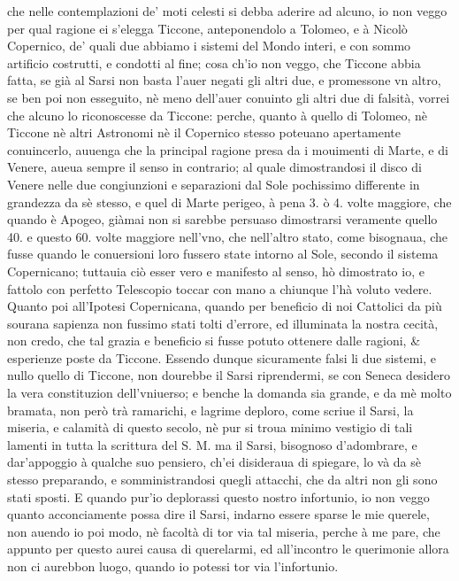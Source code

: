 \documentclass[11pt,twoside,openany]{book}
\begin{document}
che nelle contemplazioni de' moti celesti si debba aderire ad alcuno, io non veggo per qual ragione ei s'elegga Ticcone, anteponendolo a Tolomeo, e à Nicolò Copernico, de' quali due abbiamo i sistemi del Mondo interi, e con sommo artificio costrutti, e condotti al fine; cosa ch'io non veggo, che Ticcone abbia fatta, se già al Sarsi non basta l'auer negati gli altri due, e promessone vn altro, se ben poi non esseguito, nè meno dell'auer conuinto gli altri due di falsità, vorrei che alcuno lo riconoscesse da Ticcone: perche, quanto à quello di Tolomeo, nè Ticcone nè altri Astronomi nè il Copernico stesso poteuano apertamente conuincerlo, auuenga che la principal ragione presa da i mouimenti di Marte, e di Venere, aueua sempre il senso in contrario; al quale dimostrandosi il disco di Venere nelle due congiunzioni e separazioni dal Sole pochissimo differente in grandezza da sè stesso, e quel di Marte perigeo, à pena 3. ò 4. volte maggiore, che quando è Apogeo, giàmai non si sarebbe persuaso dimostrarsi veramente quello 40. e questo 60. volte maggiore nell'vno, che nell'altro stato, come bisognaua, che fusse quando le conuersioni loro fussero state intorno al Sole, secondo il sistema Copernicano; tuttauia ciò esser vero e manifesto al senso, hò dimostrato io, e fattolo con perfetto Telescopio toccar con mano a chiunque l'hà voluto vedere. Quanto poi all'Ipotesi Copernicana, quando per beneficio di noi Cattolici da più sourana sapienza non fussimo stati tolti d'errore, ed illuminata la nostra cecità, non credo, che tal grazia e beneficio si fusse potuto ottenere dalle ragioni, \& esperienze poste da Ticcone. Essendo dunque sicuramente falsi li due sistemi, e nullo quello di Ticcone, non dourebbe il Sarsi riprendermi, se con Seneca desidero la vera constituzion dell'vniuerso; e benche la domanda sia grande, e da mè molto bramata, non però trà ramarichi, e lagrime deploro, come scriue il Sarsi, la miseria, e calamità di questo secolo, nè pur si troua minimo vestigio di tali lamenti in tutta la scrittura del S. M. ma il Sarsi, bisognoso d'adombrare, e dar'appoggio à qualche suo pensiero, ch'ei disideraua di spiegare, lo và da sè stesso preparando, e somministrandosi quegli attacchi, che da altri non gli sono stati sposti. E quando pur'io deplorassi questo nostro infortunio, io non veggo quanto acconciamente possa dire il Sarsi, indarno essere sparse le mie querele, non auendo io poi modo, nè facoltà di tor via tal miseria, perche à me pare, che appunto per questo aurei causa di querelarmi, ed all'incontro le querimonie allora non ci aurebbon luogo, quando io potessi tor via l'infortunio.
\end{document}
